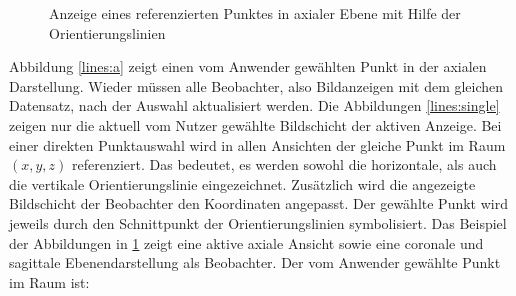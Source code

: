 \begin{figure}[htb]
\centering
{}
\caption{Anzeige eines referenzierten Punktes in axialer Ebene mit Hilfe der Orientierungslinien}
\label{lines}
\end{figure}

Abbildung \ref{lines:a} zeigt einen vom Anwender gewählten Punkt in der axialen Darstellung. Wieder müssen alle Beobachter, also Bildanzeigen mit dem gleichen Datensatz, nach der Auswahl aktualisiert werden. Die Abbildungen \ref{lines:single} zeigen nur die aktuell vom Nutzer gewählte Bildschicht der aktiven Anzeige. Bei einer direkten Punktauswahl wird in allen Ansichten der gleiche Punkt im Raum $(x, y, z)$ referenziert. Das bedeutet, es werden sowohl die horizontale, als auch die vertikale Orientierungslinie eingezeichnet. Zusätzlich wird die angezeigte Bildschicht der Beobachter den Koordinaten angepasst. Der gewählte Punkt wird jeweils durch den Schnittpunkt der Orientierungslinien symbolisiert. Das Beispiel der Abbildungen in \ref{lines} zeigt eine aktive axiale Ansicht sowie eine coronale und sagittale Ebenendarstellung als Beobachter. Der vom Anwender gewählte Punkt im Raum ist:


